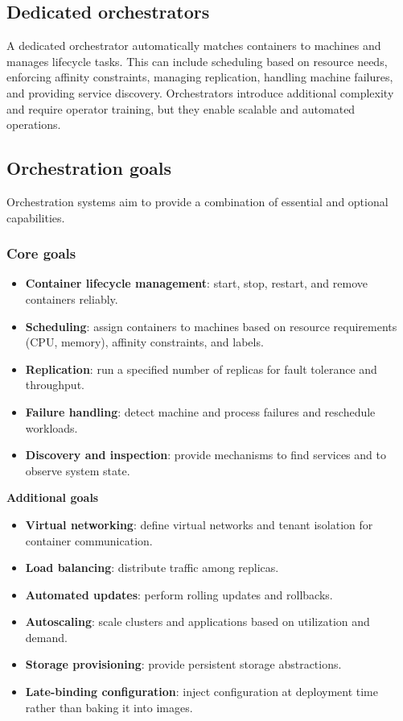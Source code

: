 \documentclass[11pt,a4paper,openany]{report}
\begin{document}
\subsection{Dedicated orchestrators}

A dedicated orchestrator automatically matches containers to machines and manages lifecycle tasks. This can include scheduling based on resource needs, enforcing affinity constraints, managing replication, handling machine failures, and providing service discovery. Orchestrators introduce additional complexity and require operator training, but they enable scalable and automated operations.

\subsection{Orchestration goals}

Orchestration systems aim to provide a combination of essential and optional capabilities.

\subsubsection*{Core goals}

\begin{itemize}
\item \textbf{Container lifecycle management}: start, stop, restart, and remove containers reliably.
\item \textbf{Scheduling}: assign containers to machines based on resource requirements (CPU, memory), affinity constraints, and labels.
\item \textbf{Replication}: run a specified number of replicas for fault tolerance and throughput.
\item \textbf{Failure handling}: detect machine and process failures and reschedule workloads.
\item \textbf{Discovery and inspection}: provide mechanisms to find services and to observe system state.
\end{itemize}

\textbf{Additional goals}

\begin{itemize}
\item \textbf{Virtual networking}: define virtual networks and tenant isolation for container communication.
\item \textbf{Load balancing}: distribute traffic among replicas.
\item \textbf{Automated updates}: perform rolling updates and rollbacks.
\item \textbf{Autoscaling}: scale clusters and applications based on utilization and demand.
\item \textbf{Storage provisioning}: provide persistent storage abstractions.
\item \textbf{Late-binding configuration}: inject configuration at deployment time rather than baking it into images.
\end{itemize}
\end{document}

